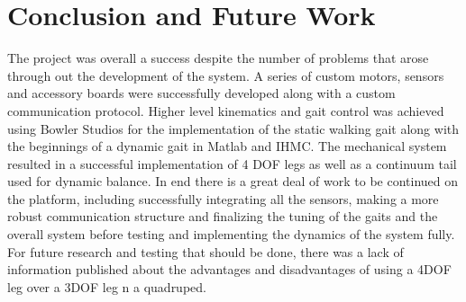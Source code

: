\section{Conclusion and Future Work}

The project was overall a success despite the number of problems that arose through out the development of the system. A series of custom motors, sensors and accessory boards were successfully developed along with a custom communication protocol. Higher level kinematics and gait control was achieved using Bowler Studios for the implementation of the static walking gait along with the beginnings of a dynamic gait in Matlab and IHMC. The mechanical system resulted in a successful implementation of 4 DOF legs as well as a continuum tail used for dynamic balance. In end there is a great deal of work to be continued on the platform, including successfully integrating all the sensors, making a more robust communication structure and finalizing the tuning of the gaits and the overall system before testing and implementing the dynamics of the system fully. For future research and testing that should be done, there was a lack of information published about the advantages and disadvantages of using a 4DOF leg over a 3DOF leg n a quadruped.
